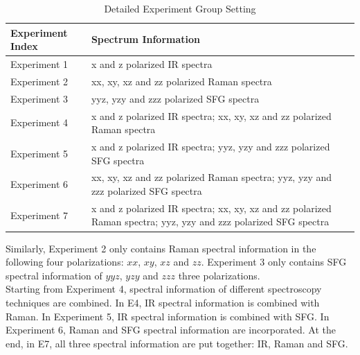 
\begin{table}\tiny \label{tab:5.1} 
\begin{center}
\begin{tabular}{| l | l | l  }
\hline
Experiment Index & Spectrum Information \\
\hline
Experiment 1 & x and z polarized IR spectra\\
\hline
Experiment 2 & xx, xy, xz and zz polarized Raman spectra \\
\hline
Experiment 3 & yyz, yzy and zzz polarized SFG spectra \\
\hline
Experiment 4 & x and z polarized IR spectra; xx, xy, xz and zz polarized Raman spectra \\
\hline
Experiment 5 & x and z polarized IR spectra; yyz, yzy and zzz polarized SFG spectra   \\
\hline
Experiment 6 & xx, xy, xz and zz polarized Raman spectra; yyz, yzy and zzz polarized SFG spectra \\
\hline
Experiment 7 & x and z polarized IR spectra; xx, xy, xz and zz polarized Raman spectra; yyz, yzy and zzz polarized SFG spectra \\
\hline
\end{tabular} 
\end{center}
\caption{Detailed Experiment Group Setting} 
\end{table}	



Similarly, Experiment 2 only contains Raman spectral information in the following four polarizations: $xx$, $xy$, $xz$ and $zz$. Experiment 3 only contains SFG spectral information of $yyz$, $yzy$ and $zzz$ three polarizations. \\

Starting from Experiment 4, spectral information of different spectroscopy techniques are combined. In E4, IR spectral information is combined with Raman. In Experiment 5, IR spectral information is combined with SFG. In Experiment 6, Raman and SFG spectral information are incorporated. At the end, in E7, all three spectral information are put together: IR, Raman and SFG. \\

